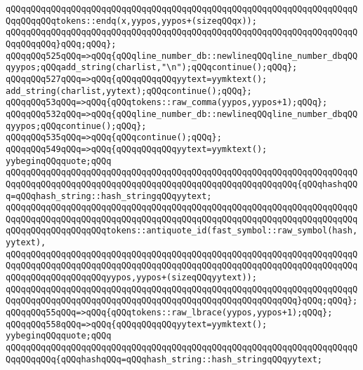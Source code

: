 \verb|qQQqqQQqqQQqqQQqqQQqqQQqqQQqqQQqqQQqqQQqqQQqqQQqqQQqqQQqqQQqqQQqqQQqqQQqqQQqqQQqtokens::endq(x,yypos,yypos+(sizeqQQqx));|\newline
\verb|qQQqqQQqqQQqqQQqqQQqqQQqqQQqqQQqqQQqqQQqqQQqqQQqqQQqqQQqqQQqqQQqqQQqqQQqqQQqqQQq}qQQq;qQQq};|\newline
\verb|qQQqqQQq525qQQq=>qQQq{qQQqline_number_db::newlineqQQqline_number_dbqQQqyypos;qQQqadd_string(charlist,"\n");qQQqcontinue();qQQq};|\newline
\verb|qQQqqQQq527qQQq=>qQQq{qQQqqQQqqQQqyytext=yymktext();|\newline
\verb|add_string(charlist,yytext);qQQqcontinue();qQQq};|\newline
\verb|qQQqqQQq53qQQq=>qQQq{qQQqtokens::raw_comma(yypos,yypos+1);qQQq};|\newline
\verb|qQQqqQQq532qQQq=>qQQq{qQQqline_number_db::newlineqQQqline_number_dbqQQqyypos;qQQqcontinue();qQQq};|\newline
\verb|qQQqqQQq535qQQq=>qQQq{qQQqcontinue();qQQq};|\newline
\verb|qQQqqQQq549qQQq=>qQQq{qQQqqQQqqQQqyytext=yymktext();|\newline
\verb|yybeginqQQqquote;qQQq|\newline
\verb|qQQqqQQqqQQqqQQqqQQqqQQqqQQqqQQqqQQqqQQqqQQqqQQqqQQqqQQqqQQqqQQqqQQqqQQqqQQqqQQqqQQqqQQqqQQqqQQqqQQqqQQqqQQqqQQqqQQqqQQqqQQqqQQq{qQQqhashqQQq=qQQqhash_string::hash_stringqQQqyytext;|\newline
\verb|qQQqqQQqqQQqqQQqqQQqqQQqqQQqqQQqqQQqqQQqqQQqqQQqqQQqqQQqqQQqqQQqqQQqqQQqqQQqqQQqqQQqqQQqqQQqqQQqqQQqqQQqqQQqqQQqqQQqqQQqqQQqqQQqqQQqqQQqqQQqqQQqqQQqqQQqqQQqqQQqtokens::antiquote_id(fast_symbol::raw_symbol(hash,yytext),|\newline
\verb|qQQqqQQqqQQqqQQqqQQqqQQqqQQqqQQqqQQqqQQqqQQqqQQqqQQqqQQqqQQqqQQqqQQqqQQqqQQqqQQqqQQqqQQqqQQqqQQqqQQqqQQqqQQqqQQqqQQqqQQqqQQqqQQqqQQqqQQqqQQqqQQqqQQqqQQqqQQqqQQqyypos,yypos+(sizeqQQqyytext));|\newline
\verb|qQQqqQQqqQQqqQQqqQQqqQQqqQQqqQQqqQQqqQQqqQQqqQQqqQQqqQQqqQQqqQQqqQQqqQQqqQQqqQQqqQQqqQQqqQQqqQQqqQQqqQQqqQQqqQQqqQQqqQQqqQQqqQQq}qQQq;qQQq};|\newline
\verb|qQQqqQQq55qQQq=>qQQq{qQQqtokens::raw_lbrace(yypos,yypos+1);qQQq};|\newline
\verb|qQQqqQQq558qQQq=>qQQq{qQQqqQQqqQQqyytext=yymktext();|\newline
\verb|yybeginqQQqquote;qQQq|\newline
\verb|qQQqqQQqqQQqqQQqqQQqqQQqqQQqqQQqqQQqqQQqqQQqqQQqqQQqqQQqqQQqqQQqqQQqqQQqqQQqqQQq{qQQqhashqQQq=qQQqhash_string::hash_stringqQQqyytext;|\newline
